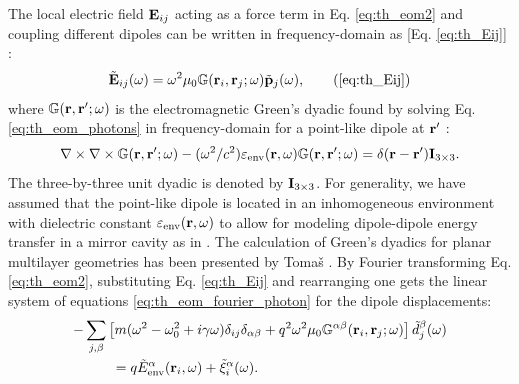 The local electric field $\mathbf{E}_{ij}$ acting as a force term in Eq. \eqref{eq:th_eom2} and coupling different dipoles can be written in frequency-domain as [Eq. \eqref{eq:th_Eij}] \cite{novotny,rosa11}:
\begin{equation}
\tilde \bE_{ij}(\omega) = \omega^2 \mu_0 \mathbb{G}(\br_i,\br_j;\omega) \tilde{\bb{p}}_j(\omega), \tag{\ref{eq:th_Eij}}
\end{equation}
where $\mathbb{G}(\mathbf{r},\mathbf{r}';\omega)$ is the electromagnetic Green's dyadic found by solving Eq. \eqref{eq:th_eom_photons} in frequency-domain for a point-like dipole at $\mathbf{r}'$ \cite{novotny}:
 \begin{equation}
 \nabla \times \nabla \times \mathbb{G}(\mathbf{r},\mathbf{r}';\omega) - (\omega^2/c^2) \varepsilon_{\textrm{env}}(\mathbf{r},\omega)\mathbb{G}(\mathbf{r},\mathbf{r}';\omega)  =  \delta(\mathbf{r}-\mathbf{r}')\mathbf{I}_{3 \times 3}. \label{eq:intro_gemdef}
\end{equation}
The three-by-three unit dyadic is denoted by $\mathbf{I}_{3 \times 3}$. For generality, we have assumed that the point-like dipole is located in an inhomogeneous environment with dielectric constant $\varepsilon_{\textrm{env}}(\mathbf{r},\omega)$ to allow for modeling dipole-dipole energy transfer in a mirror cavity as in . The calculation of Green's dyadics for planar multilayer geometries has been presented by Toma\v{s} \cite{tomas95}. By Fourier transforming Eq. \eqref{eq:th_eom2}, substituting Eq. \eqref{eq:th_Eij} and rearranging one gets the linear system of equations \eqref{eq:th_eom_fourier_photon} for the dipole displacements:
\begin{alignat}{2}
 - & \sum_{j,\beta} \left[m(\omega^2-\omega_0^2+i\gamma\omega) \delta_{ij}\delta_{\alpha\beta} +q^2 \omega^2 \mu_0 \mathbb{G}^{\alpha\beta}(\mathbf{r}_i,\mathbf{r}_j;\omega) \right]\tilde{d}_j^{\beta}(\omega) \notag \\
  & \qquad = q\tilde{E}_{\textrm{env}}^{\alpha}(\mathbf{r}_i,\omega) + \tilde{\xi}^{\alpha}_i(\omega). \label{eq:th_eom_fourier_photon_b}
\end{alignat}



